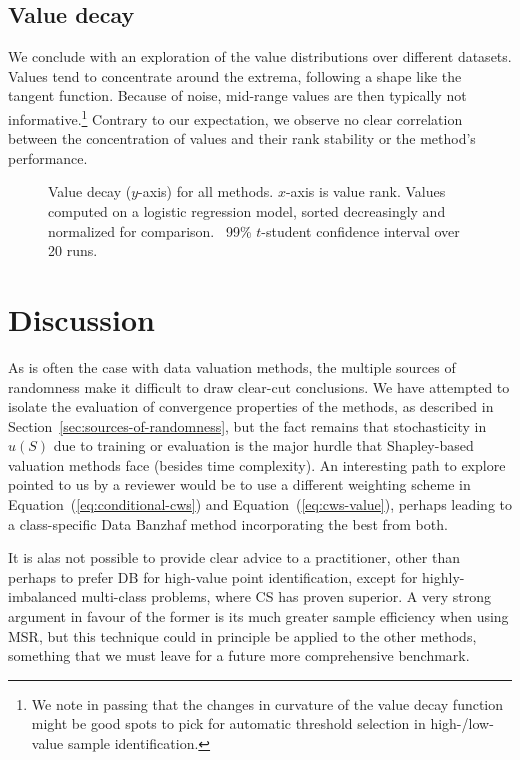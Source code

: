 \documentclass[10pt]{article}
\begin{document}
\subsection{Value decay}\label{sec:value-decay}

We conclude with an exploration of the value distributions over different
datasets. Values tend to concentrate around the extrema, following a shape
like the tangent function. Because of noise, mid-range values are then
typically not informative.\footnote{We note in passing that the changes in
curvature of the value decay function might be good spots to pick for
automatic threshold selection in high-/low-value sample identification.}
Contrary to our expectation, we observe no clear correlation between the
concentration of values and their rank stability or the method's performance.

\begin{figure}[h]
  \caption{\label{fig:value-decay}Value decay ($y$-axis) for all methods.
  $x$-axis is value rank. Values computed on a logistic regression model,
  sorted decreasingly and normalized for comparison. \ 99\% $t$-student
  confidence interval over 20 runs.}
\end{figure}

\section{Discussion}

As is often the case with data valuation methods, the multiple sources of
randomness make it difficult to draw clear-cut conclusions. We have attempted
to isolate the evaluation of convergence properties of the methods, as
described in  Section~\ref{sec:sources-of-randomness}, but the fact remains
that stochasticity in $u (S)$ due to training or evaluation is the major
hurdle that Shapley-based valuation methods face (besides time complexity). An
interesting path to explore pointed to us by a reviewer would be to use a
different weighting scheme in  Equation~(\ref{eq:conditional-cws}) and 
Equation~(\ref{eq:cws-value}), perhaps leading to a class-specific Data
Banzhaf method incorporating the best from both.

It is alas not possible to provide clear advice to a practitioner, other than
perhaps to prefer DB for high-value point identification, except for
highly-imbalanced multi-class problems, where CS has proven superior. A very
strong argument in favour of the former is its much greater sample efficiency
when using MSR, but this technique could in principle be applied to the other
methods, something that we must leave for a future more comprehensive
benchmark.
\end{document}
